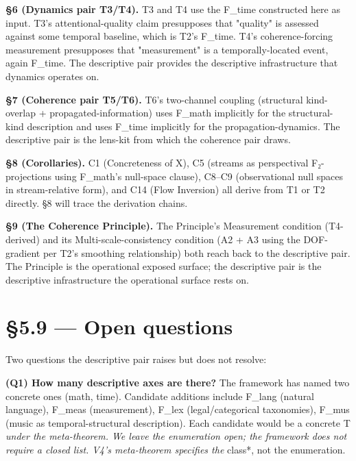 \documentclass[11pt, openany]{book}
\newcommand{\sectionbreak}{\clearpage}
\begin{document}
\textbf{§6 (Dynamics pair T3/T4).} T3 and T4 use the F\_\allowbreak{}time constructed here as input. T3's attentional-quality claim presupposes that "quality" is assessed against some temporal baseline, which is T2's F\_\allowbreak{}time. T4's coherence-forcing measurement presupposes that "measurement" is a temporally-located event, again F\_\allowbreak{}time. The descriptive pair provides the descriptive infrastructure that dynamics operates on.

\textbf{§7 (Coherence pair T5/T6).} T6's two-channel coupling (structural kind-overlap + propagated-information) uses F\_\allowbreak{}math implicitly for the structural-kind description and uses F\_\allowbreak{}time implicitly for the propagation-dynamics. The descriptive pair is the lens-kit from which the coherence pair draws.

\textbf{§8 (Corollaries).} C1 (Concreteness of X), C5 (streams as perspectival F₂-projections using F\_\allowbreak{}math's null-space clause), C8–C9 (observational null spaces in stream-relative form), and C14 (Flow Inversion) all derive from T1 or T2 directly. §8 will trace the derivation chains.

\textbf{§9 (The Coherence Principle).} The Principle's Measurement condition (T4-derived) and its Multi-scale-consistency condition (A2 + A3 using the DOF-gradient per T2's smoothing relationship) both reach back to the descriptive pair. The Principle is the operational exposed surface; the descriptive pair is the descriptive infrastructure the operational surface rests on.

\sectionbreak

\section{§5.9 --- Open questions}

Two questions the descriptive pair raises but does not resolve:

\textbf{(Q1) How many descriptive axes are there?} The framework has named two concrete ones (math, time). Candidate additions include F\_\allowbreak{}lang (natural language), F\_\allowbreak{}meas (measurement), F\_\allowbreak{}lex (legal/categorical taxonomies), F\_\allowbreak{}mus (music as temporal-structural description). Each candidate would be a concrete T\textit{ under the meta-theorem. We leave the enumeration open; the framework does not require a closed list. V4's meta-theorem specifies the }class*, not the enumeration.
\end{document}
